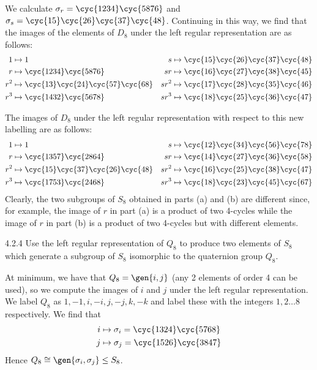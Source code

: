 \begin{solenum}
	\item We calculate $\sigma_r = \cyc{1 2 3 4}\cyc{5 8 7 6}$ and $\sigma_s = \cyc{1 5}\cyc{2 6}\cyc{3 7}\cyc{4 8}$.
	Continuing in this way, we find that the images of the elements of $D_8$ under the left regular representation are as follows:
	\begin{align*}
		1 & \mapsto 1 & s & \mapsto \cyc{1 5}\cyc{2 6}\cyc{3 7}\cyc{4 8} \\
		r & \mapsto \cyc{1 2 3 4}\cyc{5 8 7 6} & sr & \mapsto \cyc{1 6}\cyc{2 7}\cyc{3 8}\cyc{4 5} \\
		r^2 & \mapsto \cyc{1 3}\cyc{2 4}\cyc{5 7}\cyc{6 8} & sr^2 & \mapsto \cyc{1 7}\cyc{2 8}\cyc{3 5}\cyc{4 6} \\
		r^3 & \mapsto \cyc{1 4 3 2}\cyc{5 6 7 8} & sr^3 & \mapsto \cyc{1 8}\cyc{2 5}\cyc{3 6}\cyc{4 7}
	\end{align*}
	\item The images of $D_8$ under the left regular representation with respect to this new labelling are as follows:
	\begin{align*}
		1 & \mapsto 1 & s & \mapsto \cyc{1 2}\cyc{3 4}\cyc{5 6}\cyc{7 8} \\
		r & \mapsto \cyc{1 3 5 7}\cyc{2 8 6 4} & sr & \mapsto \cyc{1 4}\cyc{2 7}\cyc{3 6}\cyc{5 8} \\
		r^2 & \mapsto \cyc{1 5}\cyc{3 7}\cyc{2 6}\cyc{4 8} & sr^2 & \mapsto \cyc{1 6}\cyc{2 5}\cyc{3 8}\cyc{4 7} \\
		r^3 & \mapsto \cyc{1 7 5 3}\cyc{2 4 6 8} & sr^3 & \mapsto \cyc{1 8}\cyc{2 3}\cyc{4 5}\cyc{6 7}
	\end{align*}
	Clearly, the two subgroups of $S_8$ obtained in parts (a) and (b) are different since, for example, the image of $r$ in part (a) is a product of two 4-cycles while the image of $r$ in part (b) is a product of two 4-cycles but with different elements.
\end{solenum}

\begin{exercise}{4.2.4}
	Use the left regular representation of $Q_8$ to produce two elements of $S_8$ which generate a subgroup of $S_8$ isomorphic to the quaternion group $Q_8$.
\end{exercise}

\begin{sol}
	At minimum, we have that $Q_8 = \gen{i, j}$ (any 2 elements of order 4 can be used), so we compute the images of $i$ and $j$ under the left regular representation.
	We label $Q_8$ as $1, -1, i, -i, j, -j, k, -k$ and label these with the integers $1,2 \ldots 8$ respectively.
	We find that
	\begin{align*}
		i & \mapsto \sigma_i = \cyc{1 3 2 4}\cyc{5 7 6 8} \\
		j & \mapsto \sigma_j = \cyc{1 5 2 6}\cyc{3 8 4 7}
	\end{align*}
	Hence $Q_8 \cong \gen{\sigma_i, \sigma_j} \leq S_8$.
\end{sol}


